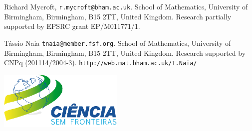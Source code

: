 \documentclass[a1paper,extrafontsizes,32pt]{a0poster}
\begin{document}



\begin{minipage}{.6\textwidth}
  \vfill
  
  \fontsize{16}{18}\selectfont
  Richard Mycroft, \textcolor{dark}{\texttt{r.mycroft@bham.ac.uk}}. School of Mathematics, University of Birmingham, Birmingham, B15 2TT, United Kingdom. Research partially supported by EPSRC grant EP/M011771/1.

  \medskip
  
T\'assio Naia \textcolor{dark}{\texttt{tnaia@member.fsf.org}}. School of Mathematics, University of Birmingham, Birmingham, B15 2TT, United Kingdom. Research supported by CNPq (201114/2004-3). \hfill \textcolor{dark}{\texttt{http://web.mat.bham.ac.uk/T.Naia/}}
\end{minipage}
\begin{minipage}{.38\textwidth}

\begin{center}
{}
\quad\includegraphics[width=6cm]{logo-vetorizada_portugues.png}


\end{center}
\end{minipage}
\end{document}
